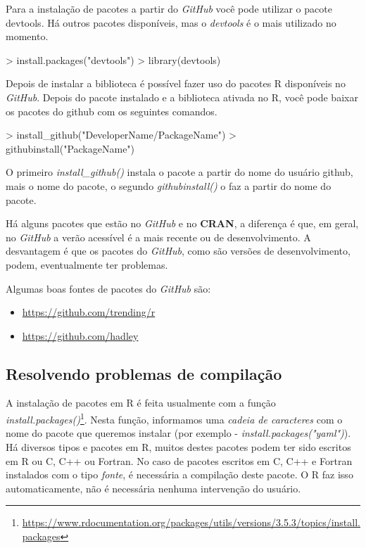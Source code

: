 \documentclass[12pt,a4paper,oneside]{erdc}
\begin{document}
Para a instalação de pacotes a partir do \textit{GitHub} você pode utilizar o pacote devtools. Há outros pacotes disponíveis, mas o \textit{devtools} é o mais utilizado no momento.

\begin{Schunk}
\begin{Sinput}
> install.packages("devtools")
> library(devtools)
\end{Sinput}
\end{Schunk}

Depois de instalar a biblioteca é possível fazer uso do pacotes R disponíveis no \textit{GitHub}. Depois do pacote instalado e a biblioteca ativada no R, você pode baixar os pacotes do github com os seguintes comandos.

\begin{Schunk}
\begin{Sinput}
> install_github("DeveloperName/PackageName")
> githubinstall("PackageName")
\end{Sinput}
\end{Schunk}

O primeiro \textit{install\_github()} instala o pacote a partir do nome do usuário github, mais o nome do pacote, o segundo \textit{githubinstall()} o faz a partir do nome do pacote.

Há alguns pacotes que estão no \textit{GitHub} e no \textbf{CRAN}, a diferença é que, em geral, no \textit{GitHub} a verão acessível é a mais recente ou  de desenvolvimento. A desvantagem é que os pacotes do \textit{GitHub}, como são versões de desenvolvimento, podem, eventualmente ter problemas.

Algumas boas fontes de pacotes do \textit{GitHub} são:

\begin{itemize}
	\item \url{https://github.com/trending/r}
	\item \url{https://github.com/hadley}
\end{itemize}



\subsection{Resolvendo problemas de compilação}

A instalação de pacotes em R é feita usualmente com a função \textit{install.packages()}\footnote{\url{https://www.rdocumentation.org/packages/utils/versions/3.5.3/topics/install.packages}}. Nesta função, informamos uma \textit{cadeia de caracteres} com o nome do pacote que queremos instalar (por exemplo - \textit{install.packages("yaml")}). Há diversos tipos e pacotes em R, muitos destes pacotes podem ter sido escritos em R ou C, C++ ou Fortran. No caso de pacotes escritos em C, C++ e Fortran instalados com o tipo \textit{fonte}, é necessária a compilação deste pacote. O R faz isso automaticamente, não é necessária nenhuma intervenção do usuário. 
\end{document}
